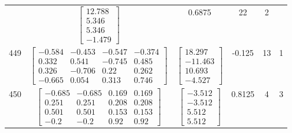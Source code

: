 \documentclass[a4paper,12pt]{article}
\begin{document}
\begin{tabular}{c c c c c c}
&
$\begin{bmatrix} 12.788 \\ 5.346 \\ 5.346 \\ -1.479 \end{bmatrix}$
&
0.6875
&
22
&
2
\\
449
&
$\begin{bmatrix} -0.584 & -0.453 & -0.547 & -0.374 \\ 0.332 & 0.541 & -0.745 & 0.485 \\ 0.326 & -0.706 & 0.22 & 0.262 \\ -0.665 & 0.054 & 0.313 & 0.746 \end{bmatrix}$
&
$\begin{bmatrix} 18.297 \\ -11.463 \\ 10.693 \\ -4.527 \end{bmatrix}$
&
-0.125
&
13
&
1
\\
450
&
$\begin{bmatrix} -0.685 & -0.685 & 0.169 & 0.169 \\ 0.251 & 0.251 & 0.208 & 0.208 \\ 0.501 & 0.501 & 0.153 & 0.153 \\ -0.2 & -0.2 & 0.92 & 0.92 \end{bmatrix}$
&
$\begin{bmatrix} -3.512 \\ -3.512 \\ 5.512 \\ 5.512 \end{bmatrix}$
&
0.8125
&
4
&
3
\\
\end{tabular} \egroup \newpage
\end{document}
